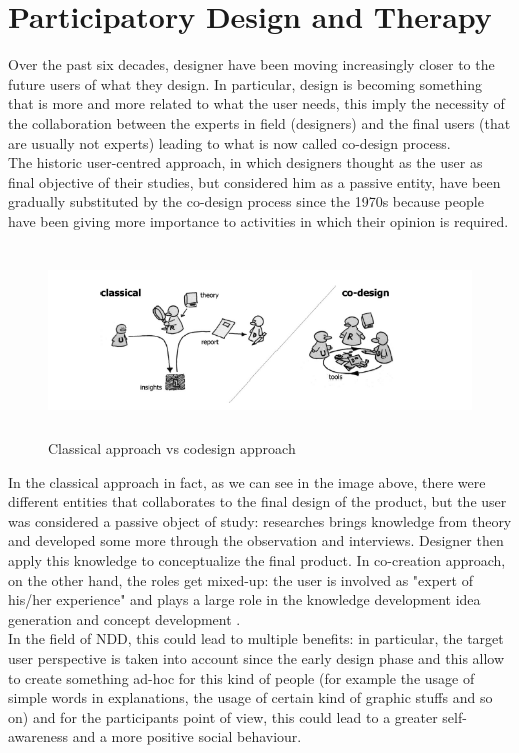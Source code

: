 \section{Participatory Design and Therapy}
Over the past six decades, designer have been moving increasingly closer to the future users of what they design. In particular, design is becoming something that is more and more related to what the user needs, this imply the necessity of the collaboration between the experts in field (designers) and the final users (that are usually not experts) leading to what is now called co-design process.\\
The historic user-centred approach, in which designers thought as the user as final objective of their studies, but considered him as a passive entity, have been gradually substituted by the co-design process since the 1970s because people have been giving more importance to activities in which their opinion is required.
\begin{figure}[H]
\centering
\includegraphics[width=16cm, height=5cm]{immagini/codesign.png}
\caption{Classical approach vs codesign approach}\label{fig:codesign}
\end{figure}
In the classical approach in fact, as we can see in the image above, there were different entities that collaborates to the final design of the product, but the user was considered a passive object of study: researches brings knowledge from theory and developed some more through the observation and interviews. Designer then apply this knowledge to conceptualize the final product. 
In co-creation approach, on the other hand, the roles get mixed-up: the user is involved as "expert of his/her experience" and plays a large role in the knowledge development idea generation and concept development \cite{Elizabeth}.\\
In the field of NDD, this could lead to multiple benefits: in particular, the target user perspective is taken into account since the early design phase and this allow to create something ad-hoc for this kind of people (for example the usage of simple words in explanations, the usage of certain kind of graphic stuffs and so on) and for the participants point of view, this could lead to a greater self-awareness and a more positive social behaviour.



